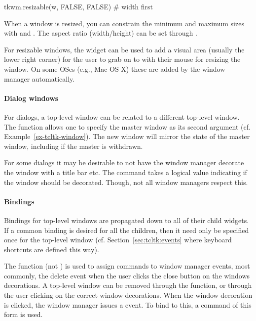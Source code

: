 \begin{Schunk}
  \begin{Sinput}
tkwm.resizable(w, FALSE, FALSE)    # width first
  \end{Sinput}
\end{Schunk}
%
When a window is resized, you can constrain the minimum and maximum
sizes with  and . The
aspect ratio (width/height) can be set through .


For resizable windows, the  widget can be
used to add a visual area (usually the lower right corner) for the
user to grab on to with their mouse for resizing the window. On some
OSes (e.g., Mac OS X) these are added by the window manager
automatically.


\paragraph{Dialog windows}
For dialogs, a top-level window can be related to
a different top-level window. The function 
allows one to specify the master window as its second
argument (cf. Example~\ref{ex-tcltk-window}). The
new window will mirror the state of the master window, including if
the master is withdrawn.

For some dialogs it may be desirable to not have the
window manager decorate the window with a title bar etc. The command
 takes a logical
value indicating if the window should be decorated. Though, not all
window managers respect this.



\paragraph{Bindings}
Bindings for top-level windows are propagated down to all of their
child widgets. If a common binding is desired for all the children,
then it need only be specified once for the top-level window
(cf. Section~\ref{sec:tcltk:events} where keyboard shortcuts are
defined this way).


The  function (not ) is used
to assign commands to window manager events, most commonly, the delete
event when the user clicks the close button on the windows
decorations. A top-level window can be removed through the
 function, or through the user clicking on the
correct window decorations. When the window decoration is clicked, the
window manager issues a  event. To bind to
this, a command of this form
 is used.

